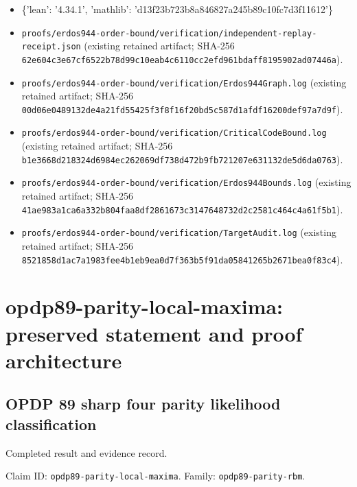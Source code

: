 \documentclass[11pt,a4paper]{article}
\begin{document}
\begin{samepage}
\begin{itemize}
\item \{'lean': '4.34.1', 'mathlib': 'd13f23b723b8a846827a245b89c10fc7d3f11612'\}
\end{itemize}
\begin{itemize}
\item \texttt{proofs/erdos944-order-bound/verification/independent-replay-receipt.json} (existing retained artifact; SHA-256 \texttt{62e604c3e67cf6522b78d99c10eab4c6110cc2efd961bdaff8195902ad07446a}).
\end{itemize}
\begin{itemize}
\item \texttt{proofs/erdos944-order-bound/verification/Erdos944Graph.log} (existing retained artifact; SHA-256 \texttt{00d06e0489132de4a21fd55425f3f8f16f20bd5c587d1afdf16200def97a7d9f}).
\end{itemize}
\begin{itemize}
\item \texttt{proofs/erdos944-order-bound/verification/CriticalCodeBound.log} (existing retained artifact; SHA-256 \texttt{b1e3668d218324d6984ec262069df738d472b9fb721207e631132de5d6da0763}).
\end{itemize}
\begin{itemize}
\item \texttt{proofs/erdos944-order-bound/verification/Erdos944Bounds.log} (existing retained artifact; SHA-256 \texttt{41ae983a1ca6a332b804faa8df2861673c3147648732d2c2581c464c4a61f5b1}).
\end{itemize}
\begin{itemize}
\item \texttt{proofs/erdos944-order-bound/verification/TargetAudit.log} (existing retained artifact; SHA-256 \texttt{8521858d1ac7a1983fee4b1eb9ea0d7f363b5f91da05841265b2671bea0f83c4}).
\end{itemize}
\end{samepage}
\clearpage
\section{opdp89-parity-local-maxima: preserved statement and proof architecture}
\subsection{OPDP 89 sharp four parity likelihood classification}
Completed result and evidence record.

Claim ID: \texttt{opdp89-parity-local-maxima}. Family: \texttt{opdp89-parity-rbm}.
\end{document}
